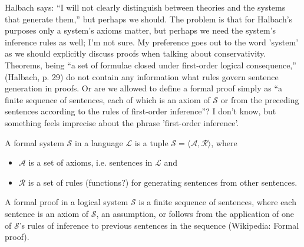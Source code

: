 %

Halbach says: ``I will not clearly distinguish between theories and the systems that generate them,'' but perhaps we should. The problem is that for Halbach's purposes only a system's axioms matter, but perhaps we need the system's inference rules as well; I'm not sure. My preference goes out to the word 'system' as we should explicitly discuss proofs when talking about conservativity. Theorems, being ``a set of formulae closed under first-order logical consequence,'' (Halbach, p. 29) do not contain any information what rules govern sentence generation in proofs. Or are we allowed to define a formal proof simply as ``a finite sequence of sentences, each of which is an axiom of $\mathcal{S}$ or from the preceding sentences according to the rules of first-order inference''? I don't know, but something feels imprecise about the phrase 'first-order inference'.

\begin{definition}
    A formal system $\mathcal{S}$ in a language $\mathcal{L}$ is a tuple $\mathcal{S} = \langle \mathcal{A}, \mathcal{R} \rangle$, where 
    \begin{itemize}
        \item $\mathcal{A}$ is a set of axioms, i.e. sentences in $\mathcal{L}$ and 
        \item $\mathcal{R}$ is a set of rules (functions?) for generating sentences from other sentences.
    \end{itemize}
\end{definition}

\begin{definition}
    \label{def:formal-proof}
    A formal proof in a logical system $\mathcal{S}$ is a finite sequence of sentences, where each sentence is an axiom of $\mathcal{S}$, an assumption, or follows from the application of one of $\mathcal{S}$'s rules of inference to previous sentences in the sequence (Wikipedia: Formal proof).
\end{definition}


